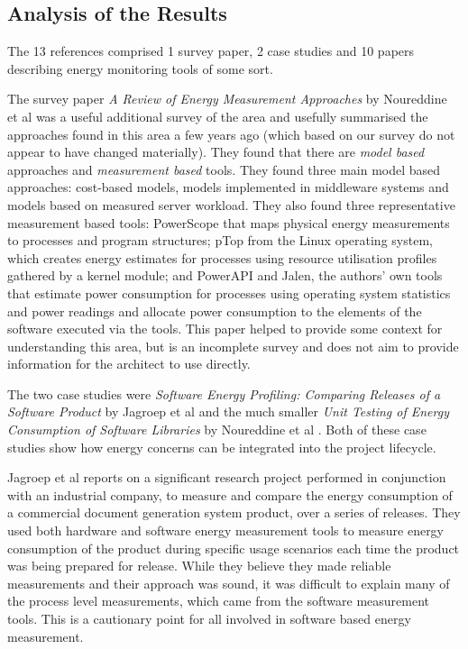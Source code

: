 \subsection{Analysis of the Results}

The 13 references comprised 1 survey paper, 2 case studies and 10 papers describing energy monitoring tools of some sort.

The survey paper \emph{A Review of Energy Measurement Approaches} by Noureddine et al \cite{noureddine2013-energyreview} was a useful additional survey of the area and usefully summarised the approaches found in this area a few years ago (which based on our survey do not appear to have changed materially).  They found that there are \emph{model based}  approaches and \emph{measurement based} tools.  They found three main model based approaches: cost-based models, models implemented in middleware systems and models based on measured server workload.  They also found three representative measurement based tools: PowerScope that maps physical energy measurements to processes and program structures; pTop from the Linux operating system, which  
creates energy estimates for processes using resource utilisation profiles gathered by a kernel module; and PowerAPI and Jalen, the authors' own tools that estimate power consumption for processes using operating system statistics and power readings and allocate power consumption to the elements of the software executed via the tools.  This paper helped to provide some context for understanding this area, but is an incomplete survey and does not aim to provide information for the architect to use directly.

The two case studies were \emph{Software Energy Profiling: Comparing Releases of a Software Product} by Jagroep et al \cite{jagroep2016-comparingreleases} and the much smaller \emph{Unit Testing of Energy Consumption of Software Libraries} by Noureddine et al \cite{noureddine2014-energyutest}.  Both of these case studies show how energy concerns can be integrated into the project lifecycle.

Jagroep et al reports on a significant research project performed in conjunction with an industrial company, to measure and compare the energy consumption of a commercial document generation system product, over a series of releases.  They used both hardware and software energy measurement tools to measure energy consumption of the product during specific usage scenarios each time the product was being prepared for release.  While they believe they made reliable measurements and their approach was sound, it was difficult to explain many of the process level measurements, which came from the software measurement tools.  This is a cautionary point for all involved in software based energy measurement.


